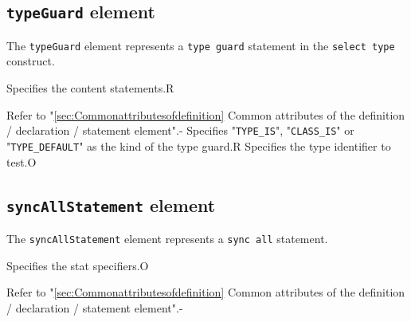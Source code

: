 \subsection{ {\tt typeGuard} element}

The {\tt typeGuard} element represents a {\tt type guard} statement in the {\tt select type} construct.


\begin{XcodeMLChildElements}
{Specifies the content statements.}{R}
\end{XcodeMLChildElements}

\begin{XcodeMLAttributes}
{Refer to "\ref{sec:Commonattributesofdefinition} Common attributes of the definition / declaration / statement element".}{-}
{Specifies "{\tt TYPE\_IS}", "{\tt CLASS\_IS}" or "{\tt TYPE\_DEFAULT}" as the kind of the type guard.}{R}
{Specifies the type identifier to test.}{O}
\end{XcodeMLAttributes}


\subsection{ {\tt syncAllStatement} element}

The {\tt syncAllStatement} element represents a {\tt sync all} statement.


\begin{XcodeMLChildElements}
{Specifies the stat specifiers.}{O}
\end{XcodeMLChildElements}

\begin{XcodeMLAttributes}
{Refer to "\ref{sec:Commonattributesofdefinition} Common attributes of the definition / declaration / statement element".}{-}
\end{XcodeMLAttributes}


